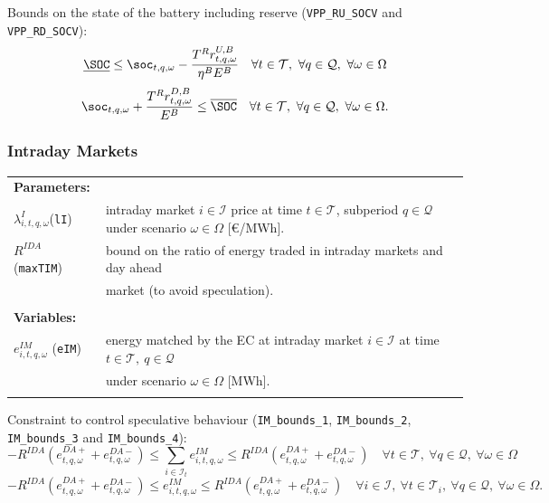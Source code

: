 Bounds on the state of the battery including reserve (\verb|VPP_RU_SOCV| and  \verb|VPP_RD_SOCV|):
\begin{equation} \label{EQ:VPP_RU_SOCV2}
	\underline{\SOC} \leq \soc_{t,q, \omega} - \frac{T^R r^{U, B}_{t,q, \omega}}{\eta^B E^B} \quad \forall t \in \mathcal{T}, \ \forall q \in \mathcal{Q}, \ \forall \omega \in \Omega
\end{equation}
\begin{equation} \label{EQ:VPP_RD_SOCV2}
	\soc_{t,q, \omega} + \frac{T^R r^{D, B}_{t,q, \omega} }{E^B} \leq \overline{\SOC} \quad \forall t \in \mathcal{T}, \ \forall q \in \mathcal{Q}, \ \forall \omega \in \Omega.
\end{equation}

\subsubsection{Intraday Markets}

\begin{tabularx}{\textwidth}{l X}
    
    \textbf{Parameters:} \\
    	$\lambda^I_{i, t,q, \omega}$(\texttt{lI}) & intraday market $i \in \mathcal{I}$ price at time $t \in \mathcal{T}$, subperiod $q \in \mathcal{Q}$ under scenario $\omega \in \Omega$ [\euro/MWh]. \\
	$R^{IDA}$ (\texttt{maxTIM}) & bound on the ratio of energy traded in intraday markets and day ahead \\
	& market (to avoid speculation).\\
    \\ 
       
    \textbf{Variables:} \\
    $e^{IM}_{i, t, q, \omega}$ (\texttt{eIM}) & energy matched by the EC at intraday market $i \in \mathcal{I}$ at time $t \in \mathcal{T}, \  q \in \mathcal{Q}$ \\
    & under scenario $\omega \in \Omega$ [MWh]. \\
	\\
\end{tabularx}

Constraint to control speculative behaviour (\verb|IM_bounds_1|, \verb|IM_bounds_2|, \verb|IM_bounds_3| and \verb|IM_bounds_4|):
\begin{equation} \label{EQ:DM_IM_12}
	-R^{IDA} (e^{DA+}_{t,q, \omega} + e^{DA-}_{t,q, \omega})  \leq \sum_{i \in \mathcal{I}_t} e^{IM}_{i, t, q, \omega} \leq R^{IDA} (e^{DA+}_{t,q, \omega} + e^{DA-}_{t,q, \omega}) \quad \forall t \in \mathcal{T}, \ \forall q \in \mathcal{Q}, \ \forall \omega \in \Omega
\end{equation}
\begin{equation} \label{EQ:IM_bounds_3-42}
	-R^{IDA} (e^{DA+}_{t,q, \omega} + e^{DA-}_{t,q, \omega}) \leq e^{IM}_{i, t,q, \omega} \leq R^{IDA} (e^{DA+}_{t,q, \omega} + e^{DA-}_{t,q, \omega}) \quad \forall i \in \mathcal{I}, \ \forall t \in \mathcal{T}_i, \ \forall q \in \mathcal{Q}, \ \forall \omega \in \Omega.
\end{equation}

